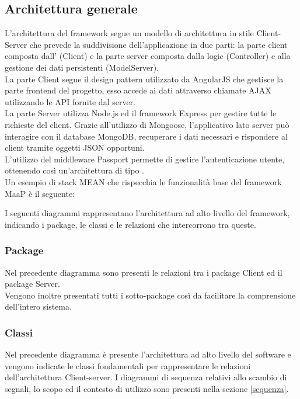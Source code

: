 \subsection{Architettura generale}
L'architettura del framework segue un modello di architettura in stile Client-Server che prevede la suddivisione dell'applicazione in due parti: la parte client composta dall' (Client) e la parte server composta dalla  logic (Controller) e alla gestione dei dati persistenti (ModelServer).\\
La parte Client segue il design pattern  utilizzato da AngularJS che gestisce la parte frontend del progetto, esso accede ai dati attraverso chiamate AJAX utilizzando le API fornite dal server.\\
La parte Server utilizza Node.js ed il framework Express per gestire tutte le richieste  del client. Grazie all'utilizzo di Mongoose, l'applicativo lato server può interagire con il database MongoDB, recuperare i dati necessari e rispondere al client tramite oggetti JSON opportuni.\\ L'utilizzo del middleware Passport permette di gestire l'autenticazione utente, ottenendo così un'architettura di tipo .\\
Un esempio di stack MEAN che rispecchia le funzionalità base del framework MaaP è il seguente:

I seguenti diagrammi rappresentano l'architettura ad alto livello del framework, indicando i package, le classi e le relazioni che intercorrono tra queste.

\subsubsection{Package}
Nel precedente diagramma sono presenti le relazioni tra i package Client ed il package Server.\\
Vengono inoltre presentati tutti i sotto-package così da facilitare la comprensione dell'intero sistema.

\subsubsection{Classi}
Nel precedente diagramma è presente l'architettura ad alto livello del software e vengono indicate le classi fondamentali per rappresentare le relazioni dell'architettura Client-server. I diagrammi di sequenza relativi allo scambio di segnali, lo scopo ed il contesto di utilizzo sono presenti nella sezione \ref{sequenza}.

